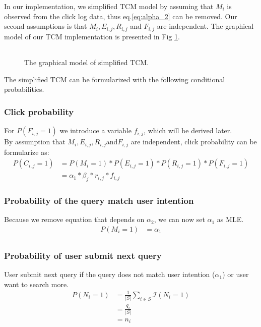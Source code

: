In our implementation, we simplified TCM model by assuming that $M_i$ is observed from the click log data, thus eq.\ref{eq:alpha_2} can be removed.
Our second assumptions is that $M_i, E_{i,j},R_{i,j}$ and $F_{i,j}$ are independent.
The graphical model of our TCM implementation is presented in Fig \ref{fig:tcm_gm_new}.
\begin{figure}[ht!]
	\begin{center}
		\begin{tabular}{c}
			
		\end{tabular}
	\end{center}
	\caption{The graphical model of simplified TCM.}
	\label{fig:tcm_gm_new}
\end{figure}

The simplified TCM can be formularized with the following conditional probabilities.

\subsubsection{Click probability}
For $P(F_{i,j}=1)$ we introduce a variable $f_{i,j}$, which will be derived later. \\
By assumption that $M_i, E_{i,j},R_{i,j}$and$F_{i,j}$ are independent, click probability can be formularize as:
\begin{align}
	P(C_{i,j} = 1)
	&= P(M_i=1) * P(E_{i,j}=1) * P(R_{i,j}=1) * P(F_{i,j} = 1) \\
	&= \alpha_1 * \beta_j * r_{i,j} * f_{i,j}
	\label{eq:proba_click}
\end{align}

\subsubsection{Probability of the query match user intention}
Because we remove equation that depends on $\alpha_2$, we can now set $\alpha_1$ as MLE.
\begin{align*}
	P(M_i = 1) 
	&= \alpha_1 \\
\end{align*}

\subsubsection{Probability of user submit next query}
User submit next query if the query does not match user intention ($\alpha_1$) or user want to search more.
\begin{align*}
	P(N_i=1) 
	&= \frac{1}{|S|} \sum_{i\in S} \mathcal{I}(N_i=1) \\
	&= \frac{q_i}{|S|} \\
	&= n_i
\end{align*}

